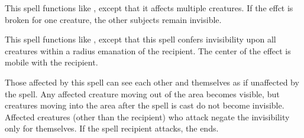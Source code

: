 \spellrng{\rngmed}
\begin{spelleffect}
  This spell functions like , except that it affects multiple creatures. If the effct is broken for one creature, the other subjects remain invisible.
\end{spelleffect}

\begin{spelleffect}
  This spell functions like , except that this spell confers invisibility upon all creatures within a \areasmall radius emanation of the recipient. The center of the effect is mobile with the recipient.
  \par Those affected by this spell can see each other and themselves as if unaffected by the spell. Any affected creature moving out of the area becomes visible, but creatures moving into the area after the spell is cast do not become invisible. Affected creatures (other than the recipient) who attack negate the invisibility only for themselves. If the spell recipient attacks, the  ends.
\end{spelleffect}

